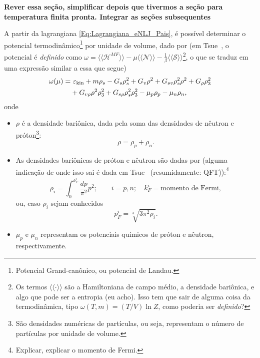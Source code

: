 \textbf{Rever essa seção, simplificar depois que tivermos a seção para temperatura finita pronta. Integrar as seções subsequentes}

A partir da lagrangiana \eqref{Eq:Lagrangiana_eNLJ_Pais}, é possível determinar  o potencial termodinâmico\footnote{Potencial Grand-canônico, ou potencial de Landau.} por unidade de volume, dado por (em Tsue~\cite{japoneses}, o potencial é \emph{definido} como $\omega = \langle\langle \mathcal{H}^{MF}\rangle\rangle - \mu\langle\langle\mathcal{N}\rangle\rangle - \frac{1}{\beta}\langle\langle\mathcal{S}\rangle\rangle$\footnote{Os termos $\langle\langle \cdot \rangle\rangle$ são a Hamiltoniana de campo médio, a densidade bariônica, e algo que pode ser a entropia (eu acho). Isso tem que sair de alguma coisa da termodinâmica, tipo $\omega (T, m) = (T/V) \ln Z$, como poderia ser \emph{definido}?}, o que se traduz em uma expressão similar a essa que segue)
\begin{equation}\label{Eq:potencial_termodinamico}
\begin{split}
	\omega(\mu) =&~ \varepsilon_{\rm{kin}} + m\rho_s - G_s\rho_s^2 + G_v\rho^2 + G_{sv}\rho_s^2\rho^2 + G_\rho\rho_3^2 \\
	&+ G_{v\rho}\rho^2\rho_3^2 + G_{s\rho}\rho_s^2\rho_3^2 - \mu_p\rho_p - \mu_n\rho_n,
\end{split}
\end{equation}
%
onde
\begin{itemize}
	\item $\rho$ é a densidade bariônica, dada pela soma das densidades de nêutron e próton\footnote[][-1cm]{São densidades numéricas de partículas, ou seja, representam o número de partículas por unidade de volume.}:
	\begin{equation}
		\rho = \rho_p + \rho_n.
	\end{equation}

	\item As densidades bariônicas de próton e nêutron são dadas por (alguma indicação de onde isso sai é dada em Tsue~\cite{japoneses} (resumidamente: QFT)):\footnote{Explicar, explicar o momento de Fermi.}
	\begin{equation}
		\rho_i = \int_0^{k_F^i}\frac{dp}{\pi^2}p^2; \qquad i = p,n; \quad k_F^i = \textrm{momento de Fermi},
	\end{equation}
	ou, caso $\rho_i$ sejam conhecidos
	\begin{equation}\label{Eq:Mom_Fermi_a_partir_de_rho}
		p_F^i = \sqrt[3]{3\pi^2\rho_i}.
	\end{equation}
	
	\item $\mu_p$ e $\mu_n$ representam os potenciais químicos de próton e nêutron, respectivamente.
\end{itemize}

